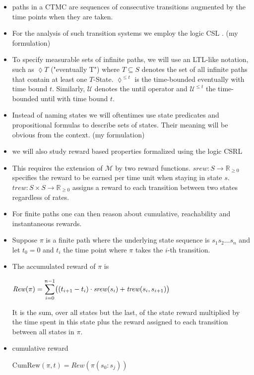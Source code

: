 \documentclass[a4paper, 10pt]{article}
\begin{document}
\begin{itemize}
	\item paths in a CTMC are sequences of consecutive transitions augmented by the time points when they are taken.
	\item For the analysis of such transition systems we employ the logic CSL \cite{assb96, bhhk00, knp07}. (my formulation)
	\item To specify measurable sets of infinite paths, we will use an LTL-like notation, such as $\lozenge T$ ("eventually T") where $T \subseteq S$ denotes the set of all infinite paths that contain at least one $T$-State. $\lozenge^{\le t}$ is the time-bounded eventually with time bound $t$. Similarly, $\mathcal{U}$ denotes the until operator and $\mathcal{U}^{\le t}$ the time-bounded until with time bound $t$.
	\item Instead of naming states we will oftentimes use state predicates and propositional formulas to describe sets of states. Their meaning will be obvious from the context. (my formulation)
	\item we will also study reward based properties formalized using the logic CSRL \cite{bhhk00, knp07}
	\item This requires the extension of $\mathcal{M}$ by two reward functions. $\mathit{srew} : S \rightarrow \mathbb{R}_{\ge 0}$ specifies the reward to be earned per time  unit when staying in state $s$. $\mathit{trew} : S \times S \rightarrow \mathbb{R}_{\ge 0}$ assigns a reward to each transition between two states regardless of rates.
	\item For finite paths one can then reason about cumulative, reachability and instantaneous rewards.
	\item Suppose $\pi$ is a finite path where the underlying state sequence is $s_1 s_2 ...s_n$ and let $t_0 = 0$ and $t_i$ the time point where $\pi$ takes the $i$-th transition.
	\item The accumulated reward of $\pi$ is
		\begin{center}
			$\mathit{Rew}(\pi) = \mathlarger{\sum}\limits_{i=0}^{n-1} \big( (t_{i+1} - t_i) \cdot \mathit{srew}(s_i) + \mathit{trew}(s_i, s_{i+1}) \big)$
		\end{center}
		It is the sum, over all states but the last, of the state reward multiplied by the time spent in this state plus the reward assigned to each transition between all states in $\pi$.
	\item cumulative reward
		\begin{center}
			$\mathrm{CumRew}(\pi, t) = \mathit{Rew}(\pi(s_0:s_j))$
		\end{center}

\end{itemize}
\end{document}
